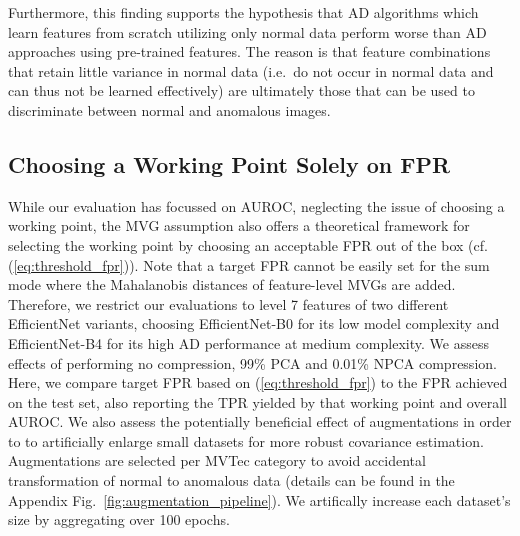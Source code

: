 \documentclass[conference, a4paper]{./template/IEEEtran}
\begin{document}
Furthermore, this finding supports the hypothesis that AD algorithms which learn features from scratch utilizing only normal data perform worse than AD approaches using pre-trained features. The reason is that feature combinations that retain little variance in normal data (i.e.\ do not occur in normal data and can thus not be learned effectively) are ultimately those that can be used to discriminate between normal and anomalous images.


\subsection{Choosing a Working Point Solely on FPR}

While our evaluation has focussed on AUROC, neglecting the issue of choosing a working point, the MVG assumption also offers a theoretical framework for selecting the working point by choosing an acceptable FPR out of the box (cf. (\ref{eq:threshold_fpr})).
Note that a target FPR cannot be easily set for the sum mode where the Mahalanobis distances of feature-level MVGs are added.
Therefore, we restrict our evaluations to level 7 features of two different EfficientNet variants, choosing EfficientNet-B0 for its low model complexity and EfficientNet-B4 for its high AD performance at medium complexity.
We assess effects of performing no compression, 99\% PCA and 0.01\% NPCA compression.
Here, we compare target FPR based on (\ref{eq:threshold_fpr}) to the FPR achieved on the test set, also reporting the TPR yielded by that working point and overall AUROC.
We also assess the potentially beneficial effect of augmentations in order to to artificially enlarge small datasets for more robust covariance estimation.
Augmentations are selected per MVTec category to avoid accidental transformation of normal to anomalous data (details can be found in the Appendix Fig.~\ref{fig:augmentation_pipeline}).
We artifically increase each dataset's size by aggregating over 100 epochs.
\end{document}
